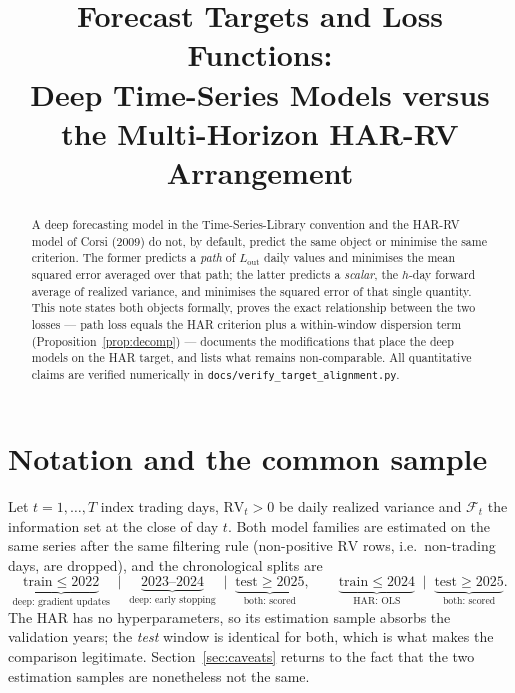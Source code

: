 \documentclass[11pt,a4paper]{article}
\title{Forecast Targets and Loss Functions:\\
Deep Time-Series Models versus the Multi-Horizon HAR-RV Arrangement}
\date{}
\newcommand{\RV}{\mathrm{RV}}
\newcommand{\Fset}{\mathcal{F}}
\newcommand{\Lout}{L_{\mathrm{out}}}
\begin{document}
\maketitle

\begin{abstract}
\noindent
A deep forecasting model in the Time-Series-Library convention and the HAR-RV model of
Corsi (2009) do not, by default, predict the same object or minimise the same criterion.
The former predicts a \emph{path} of $\Lout$ daily values and minimises the mean squared
error averaged over that path; the latter predicts a \emph{scalar}, the $h$-day forward
average of realized variance, and minimises the squared error of that single quantity.
This note states both objects formally, proves the exact relationship between the two
losses --- path loss equals the HAR criterion plus a within-window dispersion term
(Proposition~\ref{prop:decomp}) --- documents the modifications that place the deep models
on the HAR target, and lists what remains non-comparable. All quantitative claims are
verified numerically in \texttt{docs/verify\_target\_alignment.py}.
\end{abstract}


\section{Notation and the common sample}
\label{sec:setup}

Let $t=1,\dots,T$ index trading days, $\RV_t>0$ be daily realized variance and $\Fset_t$ the
information set at the close of day $t$. Both model families are estimated on the same
series after the same filtering rule (non-positive $\RV$ rows, i.e.\ non-trading days, are
dropped), and the chronological splits are
\begin{equation}
  \underbrace{\text{train} \le 2022}_{\text{deep: gradient updates}}
  \;\;\Big|\;\;
  \underbrace{2023\text{--}2024}_{\text{deep: early stopping}}
  \;\;\Big|\;\;
  \underbrace{\text{test} \ge 2025}_{\text{both: scored}},
  \qquad
  \underbrace{\text{train} \le 2024}_{\text{HAR: OLS}}
  \;\;\Big|\;\;
  \underbrace{\text{test} \ge 2025}_{\text{both: scored}} .
  \label{eq:splits}
\end{equation}
The HAR has no hyperparameters, so its estimation sample absorbs the validation years; the
\emph{test} window is identical for both, which is what makes the comparison legitimate.
Section~\ref{sec:caveats} returns to the fact that the two estimation samples are
nonetheless not the same.
\end{document}
